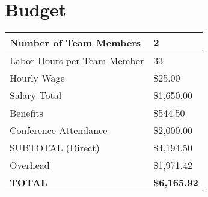 \section{Budget}
  \begin{tabular}{|l|l|}\hline
    Number of Team Members      & 2                   \\\hline
    Labor Hours per Team Member & 33                  \\\hline
    Hourly Wage                 & \$25.00             \\\hline
    Salary Total                & \$1,650.00          \\\hline
    Benefits                    & \$544.50            \\\hline
    Conference Attendance       & \$2,000.00          \\\hline
    SUBTOTAL (Direct)           & \$4,194.50          \\\hline
    Overhead                    & \$1,971.42          \\\hline
    \textbf{TOTAL}              & \textbf{\$6,165.92} \\\hline
  \end{tabular}
